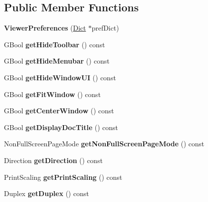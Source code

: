\subsection*{Public Member Functions}
\begin{DoxyCompactItemize}
\item 
\mbox{\label{class_viewer_preferences_a8f73d6a3295f8a7e66226cb25b9207bf}} 
{\bfseries Viewer\+Preferences} (\hyperlink{class_dict}{Dict} $\ast$pref\+Dict)
\item 
\mbox{\label{class_viewer_preferences_a6c2b9a99c43db1392936cf2e994d9fc6}} 
G\+Bool {\bfseries get\+Hide\+Toolbar} () const
\item 
\mbox{\label{class_viewer_preferences_a87525dcdb2e7f222eedaaf8fa084740a}} 
G\+Bool {\bfseries get\+Hide\+Menubar} () const
\item 
\mbox{\label{class_viewer_preferences_a9e4751e773e2b27373c47bd34e501ae5}} 
G\+Bool {\bfseries get\+Hide\+Window\+UI} () const
\item 
\mbox{\label{class_viewer_preferences_a471a91e53f745ff404d8b9d415a6545d}} 
G\+Bool {\bfseries get\+Fit\+Window} () const
\item 
\mbox{\label{class_viewer_preferences_a9eeecb55e2d8051530767068ece6976f}} 
G\+Bool {\bfseries get\+Center\+Window} () const
\item 
\mbox{\label{class_viewer_preferences_accfc0927773bb858f7f1f3187b4a9f20}} 
G\+Bool {\bfseries get\+Display\+Doc\+Title} () const
\item 
\mbox{\label{class_viewer_preferences_a0f9b7af09f73e52719782b01693e52e4}} 
Non\+Full\+Screen\+Page\+Mode {\bfseries get\+Non\+Full\+Screen\+Page\+Mode} () const
\item 
\mbox{\label{class_viewer_preferences_ac8fdff6b66db062c12a3b04edbd8285d}} 
Direction {\bfseries get\+Direction} () const
\item 
\mbox{\label{class_viewer_preferences_a9c2ae6b40c20d86dc616e1855d7cdf9a}} 
Print\+Scaling {\bfseries get\+Print\+Scaling} () const
\item 
\mbox{\label{class_viewer_preferences_a8ff3c2eaefd3bf58e2553885a9ff3844}} 
Duplex {\bfseries get\+Duplex} () const
\end{DoxyCompactItemize}


